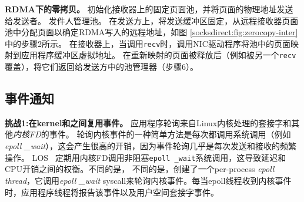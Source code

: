 \textbf {RDMA下的零拷贝。}
\libipc {}初始化接收器上的固定页面池，并将页面的物理地址发送给发送者。
发件人管理池。
在发送方上，\libipc {}将发送缓冲区固定，从远程接收器页面池中分配页面以确定RDMA写入的远程地址，如图 \ref {socksdirect:fig:zerocopy-inter}中的步骤2所示。
在接收器上，当调用\texttt {recv}时，\libipc 调用NIC驱动程序将池中的页面映射到应用程序缓冲区虚拟地址。
在重新映射的页面被释放后（例如被另一个\texttt {recv}覆盖），\libipc {}将它们返回给发送方中的池管理器（步骤6）。


%

\subsection{事件通知}
\label{socksdirect:subsec:process-mux}

\textbf {挑战1:在kernel和\libipc {}之间复用事件。}
应用程序轮询来自Linux内核处理的套接字和其他\textit {内核FD}的事件。
轮询内核事件的一种简单方法是每次都调用系统调用（例如\textit {epoll \_wait}），这会产生很高的开销，因为事件轮询几乎是每次发送和接收的频繁操作。
LOS~ \cite {huang2017high}定期用内核FD调用非阻塞\texttt {epoll \_wait}系统调用，这导致延迟和CPU开销之间的权衡。不同的是，
不同的是，\libipc {}创建了一个per-process \textit {epoll thread}，它调用\textit {epoll \_wait} syscall来轮询内核事件。每当epoll线程收到内核事件时，应用程序线程将报告该事件以及用户空间套接字事件。


